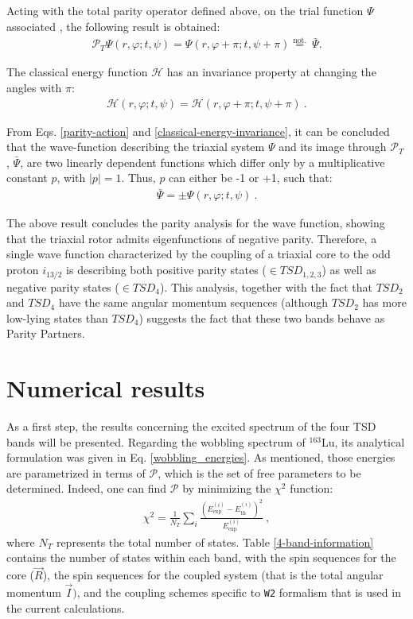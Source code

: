 \documentclass[myclassdoc,debug]{rjparticle}
\begin{document}
Acting with the total parity operator defined above, on the trial function $\Psi$ associated , the following result is obtained:
\begin{align}
    \mathcal{P}_T\Psi(r,\varphi;t,\psi)=\Psi(r,\varphi+\pi;t,\psi+\pi)\overset{\mathrm{not.}}{=}\ \bar{\Psi}.
    \label{parity-action}
\end{align}

The classical energy function $\mathcal{H}$ has an invariance property at changing the angles with $\pi$:
\begin{align}
    \mathcal{H}(r,\varphi;t,\psi)=\mathcal{H}(r,\varphi+\pi;t,\psi+\pi)\ .
    \label{classical-energy-invariance}
\end{align}

From Eqs. \ref{parity-action} and \ref{classical-energy-invariance}, it can be concluded that the wave-function describing the triaxial system $\Psi$ and its image through $\mathcal{P}_T$ , $\bar{\Psi}$,  are two linearly dependent functions which differ only by a multiplicative constant $p$, with $|p|=1$. Thus, $p$ can either be -1 or +1, such that:
\begin{align}
    \bar{\Psi}=\pm\Psi(r,\varphi;t,\psi)\ .
\end{align}

The above result concludes the parity analysis for the wave function, showing that the triaxial rotor admits eigenfunctions of negative parity. Therefore, a single wave function characterized by the coupling of a triaxial core to the odd proton $i_{13/2}$ is describing both positive parity states ($\in TSD_{1,2,3}$) as well as negative parity states ($\in TSD_4$). This analysis, together with the fact that $TSD_2$ and $TSD_4$ have the same angular momentum sequences (although $TSD_2$ has more low-lying states than $TSD_4$) suggests the fact that these two bands behave as Parity Partners.


\section{Numerical results}
\label{section-results}

As a first step, the results concerning the excited spectrum of the four TSD bands will be presented. Regarding the wobbling spectrum of $^{163}$Lu, its analytical formulation was given in Eq. \ref{wobbling_energies}. As mentioned, those energies are parametrized in terms of $\mathcal{P}$, which is the set of free parameters to be determined. Indeed, one can find $\mathcal{P}$ by minimizing the $\chi^2$ function:
\begin{align}
    \chi^2=\frac{1}{N_T}\sum_{i}\frac{(E^{(i)}_\text{exp}-E^{(i)}_\text{th})^2}{E^{(i)}_\text{exp}}\ ,
    \label{chi-square}
\end{align}
where $N_T$ represents the total number of states. Table \ref{4-band-information} contains the number of states within each band, with the spin sequences for the core ($\vec{R}$), the spin sequences for the coupled system (that is the total angular momentum $\vec{I})$, and the coupling schemes specific to \texttt{W2} formalism that is used in the current calculations. 
\end{document}
